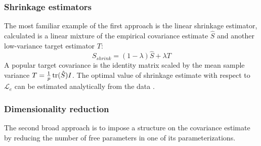 \subsubsection*{Shrinkage estimators}
The most familiar example of the first approach is the linear shrinkage estimator, calculated is a linear mixture of the empirical covariance estimate $\hat S$ and another low-variance target estimator $T$:
\begin{equation}
S_{shrink} = (1-\lambda) \hat S + \lambda T
\end{equation}
A popular target covariance is the identity matrix scaled by the mean sample variance  $T = \frac 1 p \operatorname{tr}(\hat S) I$.
The optimal value of shrinkage estimate with respect to $\mathcal L_e$ can be estimated analytically from the data \citep{Ledoit:2004,Schafer:2005}.  

\subsubsection*{Dimensionality reduction}
The second broad approach is to impose a structure on the covariance estimate by reducing the number of free parameters in one of its parameterizations. 